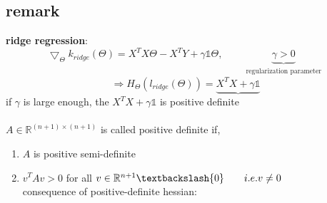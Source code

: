 \subsection*{remark}
\textbf{ridge regression}:
\[\bigtriangledown_\Theta k_{ridge}(\Theta) = X^T X \Theta - X^T Y + \gamma \mathds{1} \Theta, \quad\quad \underbrace{\gamma > 0}_{\substack{\text{regularization parameter}}}\]
\[\Rightarrow H_\Theta(l_{ridge}(\Theta)) = \underbrace{X^T X + \gamma \mathds{1}}\]
if $\gamma$ is large enough, the $X^T X +\gamma \mathds{1}$ is positive definite\\\\
$A \in \mathbb{R}^{(n+1)\times(n+1)}$ is called positive definite if,
\begin{enumerate}[1.]
\item $A$ is positive semi-definite
\item $v^T Av > 0$ for all $v \in \mathbb{R}^{n+1} \textbackslash \{0\} \quad\quad i.e. v \neq 0$\\
consequence of positive-definite hessian:

\end{enumerate}